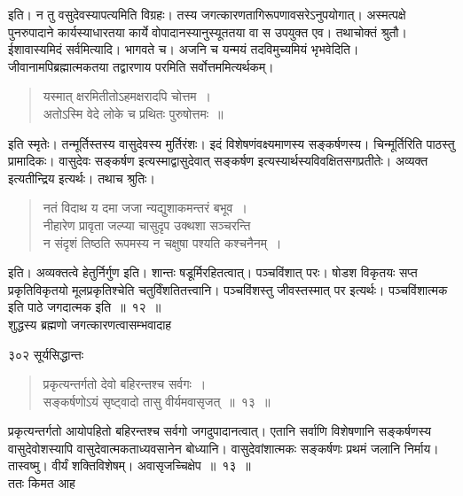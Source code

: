 \documentclass[11pt, openany]{book}
\begin{document}
इति। न तु वसुदेवस्यापत्यमिति विग्रहः। तस्य जगत्कारणतागिरूपणावसरेऽनुपयोगात्। अस्मत्पक्षे पुनरुपादाने कार्यस्याधारतया कार्ये वोपादानस्यानुस्यूततया वा स उपयुक्त एव। तथाचोक्तं श्रुतौ। ईशावास्यमिदं सर्वमित्यादि। भागवते च। अजनि च यन्मयं तदविमुच्यमियं भृभवेदिति। जीवानामपिब्रह्मात्मकतया तद्वारणाय परमिति सर्वोत्तममित्यर्थकम्। 


 \begin{quote}
 {\qt यस्मात् क्षरमितीतोऽहमक्षरादपि चोत्तम~।\\ 
अतोऽस्मि वेदे लोके च प्रथितः पुरुषोत्तमः~॥ }
\end{quote}

इति स्मृतेः। तन्मूर्तिस्तस्य वासुदेवस्य मुर्तिरंशः। इदं विशेषणंवक्ष्यमाणस्य सङ्कर्षणस्य। चिन्मूर्तिरिति पाठस्तु प्रामादिकः। वासुदेवः सङ्कर्षण इत्यस्माद्वासुदेवात् सङ्कर्षण इत्यस्यार्थस्यविवक्षितसगप्रतीतेः। अव्यक्त इत्यतीन्द्रिय इत्यर्थः। तथाच श्रुतिः। 


\begin{quote}
{\qt नतं विदाथ य दमा जजा न्यद्युशाकमन्तरं बभूव~।\\
 नीहारेण प्रावृता जल्प्या चासुदृप उक्थशा सञ्चरन्ति~\\
न संदृशं तिष्ठति रूपमस्य न चक्षुषा पश्यति कश्चनैनम्~। }
\end{quote}

इति। अव्यक्तत्वे हेतुर्निर्गुण इति। शान्तः षडूर्मिरहितत्वात्। पञ्चविंशात् परः। षोडश विकृतयः सप्त प्रकृतिविकृतयो मूलप्रकृतिश्चेति चतुर्विंशतितत्त्वानि। पञ्चविंशस्तु जीवस्तस्मात् पर इत्यर्थः। पञ्चविंशात्मक इति पाठे जगदात्मक इति~॥~१२~॥\\
\noindent शुद्धस्य ब्रह्मणो जगत्कारणत्वासम्भवादाह \textendash


\newpage


\noindent ३०२ \hspace{4cm} सूर्यसिद्धान्तः
\vspace{1cm}
 

\begin{quote}
{\ssi  प्रकृत्यन्तर्गतो देवो बहिरन्तश्च सर्वगः~।\\
सङ्कर्षणोऽयं सृष्ट्वादो तासु वीर्यमवासृजत्~॥~१३~॥ }
\end{quote}


 प्रकृत्यन्तर्गतो आयोपहितो बहिरन्तश्च सर्वगो जगदुपादानत्वात्। एतानि सर्वाणि विशेषणानि सङ्कर्षणस्य वासुदेवोशस्यापि वासुदेवात्मकताध्यवसानेन बोध्यानि। वासुदेवांशात्मकः सङ्कर्षणः प्रथमं जलानि निर्माय। तास्वष्मु। वीर्यं शक्तिविशेषम्। अवासृजच्चिक्षेप~॥~१३~॥\\
 \noindent ततः किमत आह \textendash
\end{document}
